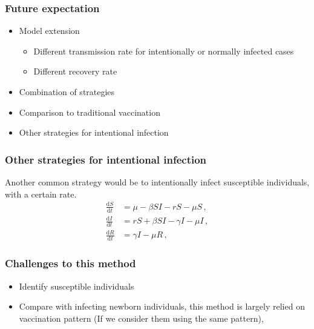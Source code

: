 \documentclass{beamer}
\newcommand\dbyd[2]{\frac{\mathrm d{#1}}{\mathrm d{#2}}}
\begin{document}
\begin{frame}
\frametitle{Future expectation}
\begin{itemize}
\item Model extension
\pause
\begin{itemize}
\item Different transmission rate for intentionally or normally infected cases
\pause
\item Different recovery rate
\end{itemize}
\pause
\item Combination of strategies
\pause
\item Comparison to traditional vaccination
\pause
\item Other strategies for intentional infection
\end{itemize}
\end{frame}
\begin{frame}
\frametitle{Other strategies for intentional infection}

Another common strategy would be to intentionally infect susceptible individuals, with a certain rate.
\pause
\begin{equation}
\begin{split}
\dbyd{S}{t}&=\mu- \beta SI-rS-\mu S\,, \\
\dbyd{I}{t}&=rS+\beta SI-\gamma I -\mu I\,,\\
\dbyd{R}{t}&=\gamma I-\mu R\,,
\end{split}
\end{equation}
\end{frame}
\begin{frame}
\frametitle{Challenges to this method}
\begin{itemize}
\item Identify susceptible individuals
\item Compare with infecting newborn individuals, this method is largely relied on vaccination pattern (If we consider them using the same pattern),
\end{itemize}
\end{frame}
\end{document}
